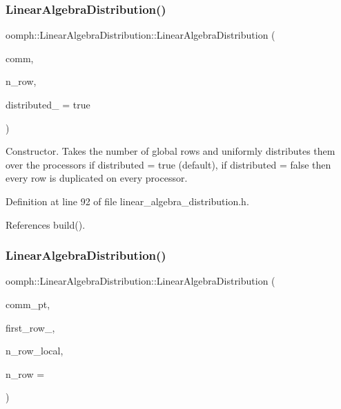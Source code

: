 \subsubsection{\texorpdfstring{Linear\+Algebra\+Distribution()}{LinearAlgebraDistribution()}\hspace{0.1cm}{\footnotesize\ttfamily [3/7]}}
{\footnotesize\ttfamily oomph\+::\+Linear\+Algebra\+Distribution\+::\+Linear\+Algebra\+Distribution (\begin{DoxyParamCaption}\item[{const \hyperlink{classoomph_1_1OomphCommunicator}{Oomph\+Communicator} \&}]{comm,  }\item[{const unsigned \&}]{n\+\_\+row,  }\item[{const bool \&}]{distributed\+\_\+ = {\ttfamily true} }\end{DoxyParamCaption})\hspace{0.3cm}{\ttfamily [inline]}}



Constructor. Takes the number of global rows and uniformly distributes them over the processors if distributed = true (default), if distributed = false then every row is duplicated on every processor. 



Definition at line 92 of file linear\+\_\+algebra\+\_\+distribution.\+h.



References build().

\mbox{\label{classoomph_1_1LinearAlgebraDistribution_a1fcec07ae49b0cb9799dcc87cc0d9ffe}} 
\subsubsection{\texorpdfstring{Linear\+Algebra\+Distribution()}{LinearAlgebraDistribution()}\hspace{0.1cm}{\footnotesize\ttfamily [4/7]}}
{\footnotesize\ttfamily oomph\+::\+Linear\+Algebra\+Distribution\+::\+Linear\+Algebra\+Distribution (\begin{DoxyParamCaption}\item[{const \hyperlink{classoomph_1_1OomphCommunicator}{Oomph\+Communicator} $\ast$const}]{comm\+\_\+pt,  }\item[{const unsigned \&}]{first\+\_\+row\+\_\+,  }\item[{const unsigned \&}]{n\+\_\+row\+\_\+local,  }\item[{const unsigned \&}]{n\+\_\+row = {} }\end{DoxyParamCaption})\hspace{0.3cm}{\ttfamily [inline]}}



